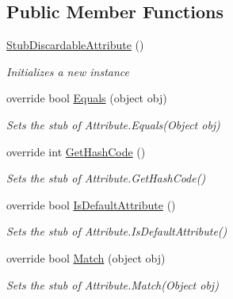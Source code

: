 \subsection*{Public Member Functions}
\begin{DoxyCompactItemize}
\item 
\hyperlink{class_system_1_1_runtime_1_1_compiler_services_1_1_fakes_1_1_stub_discardable_attribute_a97880e2ecec88252b03c57a991977e88}{Stub\-Discardable\-Attribute} ()
\begin{DoxyCompactList}\small\item\em Initializes a new instance\end{DoxyCompactList}\item 
override bool \hyperlink{class_system_1_1_runtime_1_1_compiler_services_1_1_fakes_1_1_stub_discardable_attribute_a4a56390cd82276b2f1cf70f32e46e931}{Equals} (object obj)
\begin{DoxyCompactList}\small\item\em Sets the stub of Attribute.\-Equals(\-Object obj)\end{DoxyCompactList}\item 
override int \hyperlink{class_system_1_1_runtime_1_1_compiler_services_1_1_fakes_1_1_stub_discardable_attribute_a822c509eaecf96e7466143fd79a60774}{Get\-Hash\-Code} ()
\begin{DoxyCompactList}\small\item\em Sets the stub of Attribute.\-Get\-Hash\-Code()\end{DoxyCompactList}\item 
override bool \hyperlink{class_system_1_1_runtime_1_1_compiler_services_1_1_fakes_1_1_stub_discardable_attribute_a1875d5d4c3ff021775ccf8645b2f67be}{Is\-Default\-Attribute} ()
\begin{DoxyCompactList}\small\item\em Sets the stub of Attribute.\-Is\-Default\-Attribute()\end{DoxyCompactList}\item 
override bool \hyperlink{class_system_1_1_runtime_1_1_compiler_services_1_1_fakes_1_1_stub_discardable_attribute_a36cc690d57b4fc3420f8419c8c83f60c}{Match} (object obj)
\begin{DoxyCompactList}\small\item\em Sets the stub of Attribute.\-Match(\-Object obj)\end{DoxyCompactList}\end{DoxyCompactItemize}
